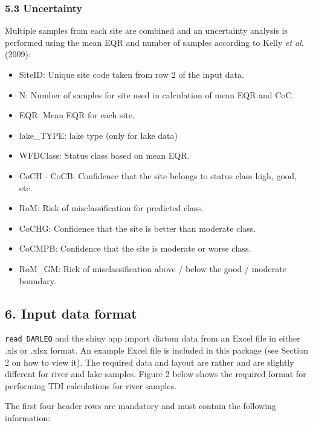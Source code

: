 \documentclass[
]{article}
\begin{document}
\hypertarget{uncertainty}{%
\subsubsection{5.3 Uncertainty}\label{uncertainty}}

Multiple samples from each site are combined and an uncertainty analysis
is performed using the mean EQR and number of samples according to Kelly
\emph{et al}. (2009):

\begin{itemize}
\item
  SiteID: Unique site code taken from row 2 of the input data.
\item
  N: Number of samples for site used in calculation of mean EQR and CoC.
\item
  EQR: Mean EQR for each site.
\item
  lake\_TYPE: lake type (only for lake data)
\item
  WFDClass: Status class based on mean EQR.
\item
  CoCH - CoCB: Confidence that the site belongs to status class high,
  good, etc.
\item
  RoM: Risk of misclassification for predicted class.
\item
  CoCHG: Confidence that the site is better than moderate class.
\item
  CoCMPB: Confidence that the site is moderate or worse class.
\item
  RoM\_GM: Rick of misclassification above / below the good / moderate
  boundary.
\end{itemize}

\hypertarget{input-data-format}{%
\subsection{6. Input data format}\label{input-data-format}}

\texttt{read\_DARLEQ} and the shiny app import diatom data from an Excel
file in either .xls or .xlsx format. An example Excel file is included
in this package (see Section 2 on how to view it). The required data and
layout are rather and are slightly different for river and lake samples.
Figure 2 below shows the required format for performing TDI calculations
for river samples.

The first four header rows are mandatory and must contain the following
information:
\end{document}
